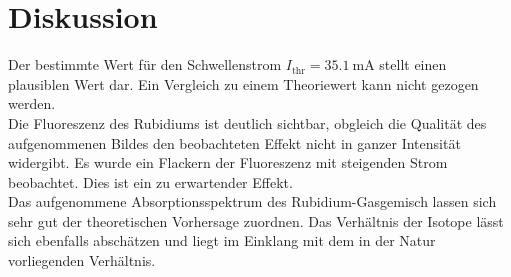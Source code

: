 \chapter{Diskussion}
\label{cha:Diskussion}

Der bestimmte Wert für den Schwellenstrom $I_{\mathrm{thr}} = \qty{35.1}{\milli\ampere}$ stellt einen plausiblen Wert dar. Ein Vergleich
zu einem Theoriewert kann nicht gezogen werden.\\
Die Fluoreszenz des Rubidiums ist deutlich sichtbar, obgleich die Qualität des aufgenommenen Bildes den beobachteten Effekt nicht in ganzer
Intensität widergibt. Es wurde ein Flackern der Fluoreszenz mit steigenden Strom beobachtet. Dies ist ein zu erwartender Effekt.\\
Das aufgenommene Absorptionsspektrum des Rubidium-Gasgemisch lassen sich sehr gut der theoretischen Vorhersage zuordnen. Das Verhältnis der
Isotope lässt sich ebenfalls abschätzen und liegt im Einklang mit dem in der Natur vorliegenden Verhältnis.